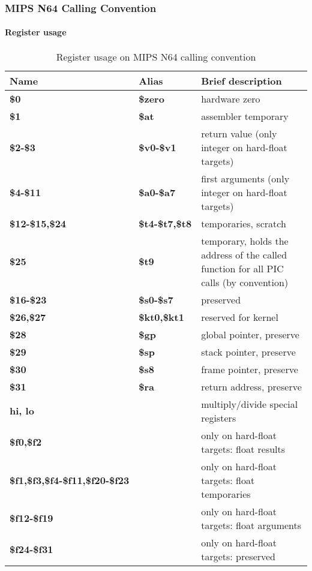 \subsubsection{MIPS N64 Calling Convention}

\paragraph{Register usage}

\begin{table}[h]
\begin{tabular*}{0.95\textwidth}{lll}
Name                                   & Alias                & Brief description\\
\hline
{\bf \$0}                              & {\bf \$zero}         & hardware zero \\
{\bf \$1}                              & {\bf \$at}           & assembler temporary \\
{\bf \$2-\$3}                          & {\bf \$v0-\$v1}      & return value (only integer on hard-float targets) \\
{\bf \$4-\$11}                         & {\bf \$a0-\$a7}      & first arguments (only integer on hard-float targets) \\
{\bf \$12-\$15,\$24}                   & {\bf \$t4-\$t7,\$t8} & temporaries, scratch \\
{\bf \$25}                             & {\bf \$t9}           & temporary, holds the address of the called function for all PIC calls (by convention) \\
{\bf \$16-\$23}                        & {\bf \$s0-\$s7}      & preserved \\
{\bf \$26,\$27}                        & {\bf \$kt0,\$kt1}    & reserved for kernel \\
{\bf \$28}                             & {\bf \$gp}           & global pointer, preserve \\
{\bf \$29}                             & {\bf \$sp}           & stack pointer, preserve \\
{\bf \$30}                             & {\bf \$s8}           & frame pointer, preserve \\
{\bf \$31}                             & {\bf \$ra}           & return address, preserve \\
{\bf hi, lo}                           &                      & multiply/divide special registers \\
{\bf \$f0,\$f2}                        &                      & only on hard-float targets: float results \\
{\bf \$f1,\$f3,\$f4-\$f11,\$f20-\$f23} &                      & only on hard-float targets: float temporaries \\
{\bf \$f12-\$f19}                      &                      & only on hard-float targets: float arguments \\
{\bf \$f24-\$f31}                      &                      & only on hard-float targets: preserved \\%
\end{tabular*}
\caption{Register usage on MIPS N64 calling convention}
\end{table}


